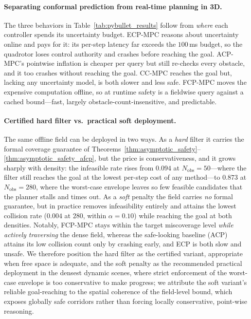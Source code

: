 \documentclass[lettersize,journal]{IEEEtran}
\begin{document}
\paragraph{Separating conformal prediction from real-time planning in 3D.}
The three behaviors in Table~\ref{tab:pybullet_results} follow from \emph{where} each
controller spends its uncertainty budget.
ECP-MPC reasons about uncertainty online and pays for it: its per-step latency far exceeds
the $100$\,ms budget, so the quadrotor loses control authority and crashes before reaching
the goal.
ACP-MPC's pointwise inflation is cheaper per query but still re-checks every obstacle, and
it too crashes without reaching the goal.
CC-MPC reaches the goal but, lacking any uncertainty model, is both slower and less safe.
FCP-MPC moves the expensive computation offline, so at runtime safety is a fieldwise query
against a cached bound---fast, largely obstacle-count-insensitive, and predictable.

\paragraph{Certified hard filter vs.\ practical soft deployment.}
The same offline field can be deployed in two ways. As a \emph{hard} filter it carries the
formal coverage guarantee of Theorems~\ref{thm:asymptotic_safety}--\ref{thm:asymptotic_safety_afcp},
but the price is conservativeness, and it grows sharply with density: the infeasible rate
rises from $0.094$ at $N_{\mathrm{obs}}=50$---where the filter still reaches the goal at the
lowest per-step cost of any method---to $0.873$ at $N_{\mathrm{obs}}=280$, where the
worst-case envelope leaves so few feasible candidates that the planner stalls and times out.
As a \emph{soft} penalty the field carries \emph{no} formal guarantee, but in practice
removes infeasibility entirely and attains the lowest collision rate ($0.004$ at $280$,
within $\alpha=0.10$) while reaching the goal at both densities.
Notably, FCP-MPC stays within the target miscoverage level \emph{while actively traversing}
the dense field, whereas the safe-looking baseline (ACP) attains its low collision count
only by crashing early, and ECP is both slow and unsafe.
We therefore position the hard filter as the certified variant, appropriate when free space
is adequate, and the soft penalty as the recommended practical deployment in the densest
dynamic scenes, where strict enforcement of the worst-case envelope is too conservative to
make progress; we attribute the soft variant's
reliable goal-reaching to the spatial coherence of the field-level bound, which exposes
globally safe corridors rather than forcing locally conservative, point-wise reasoning.
\end{document}
